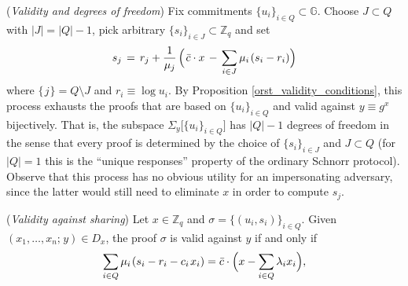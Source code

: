 \documentclass{iacrtrans}
\begin{document}
\begin{rem}\label{orst_validity_degrees_of_freedom}
(\textit{Validity and degrees of freedom})
Fix commitments $\{u_i\}_{i \in Q} \subset \mathbb{G}$.
Choose $J \subset Q$ with $|J| = |Q| - 1$,
pick arbitrary $\{s_i\}_{i \in J} \subset \mathbb{Z}_q$
and set
\vspace{5pt}
\begin{equation*}\label{orst_validity_degrees_of_freedom_formula}
s_j
	\hspace{1.5pt}
	=
	\hspace{1.5pt}
	r_j + \frac{1}{\mu_j}
	\hspace{1.5pt}
	\Big(
		\hspace{1.0pt}
		\bar{c}\cdot x
		\hspace{1.5pt}
		-
		\hspace{1.5pt}
		\sum_{i \in J}
			\mu_i
			\hspace{1pt}
			(s_i - r_i)
	\Big)
\vspace{5pt}
\end{equation*}
where $\{\hspace{1pt}j\hspace{1pt}\} = Q \setminus J$
and $r_i \equiv \log u_i$.
By Proposition \ref{orst_validity_conditions},
this process exhausts the proofs
that are based on $\{u_i\}_{i \in Q}$ and valid against
$y \equiv g ^ x$
bijectively.
That is, the subspace
$\Sigma_y \big[\{u_i\}_{i \in Q}\big]$
has $|Q| - 1$ degrees of freedom in the sense that
every proof is determined
by the choice of $\{s_i\}_{i \in J}$
and $J \subset Q$ (for $|Q| = 1$
this is the ``unique responses'' property
of the ordinary Schnorr protocol).
Observe that this process has no obvious utility
for an impersonating adversary,
since the latter would still need
to eliminate $x$ in order to compute $s_j$.
\end{rem}

\begin{prop}\label{orst_validity_against_sharing_prop}
\textup{(\textit{Validity against sharing})}
Let $x \in \mathbb{Z}_q$ and
$\sigma = \{(u_i, s_i)\}_{i \in Q}$.
Given $(x_1, \dots, x_n;\hspace{1pt} y) \in D_x$,
the proof $\sigma$ is valid against $y$ if and only if
\vspace{5pt}
\begin{equation}\label{orst_validity_against_sharing}
\sum_{i \in Q} \mu_i\hspace{1pt} (s_i - r_i - c_i\hspace{1pt}x_i)
=
\bar{c} \cdot \Big(x - \sum_{i \in Q} \lambda_i x_i\Big),
\vspace{5pt}
\end{equation}
\end{prop}
\end{document}
